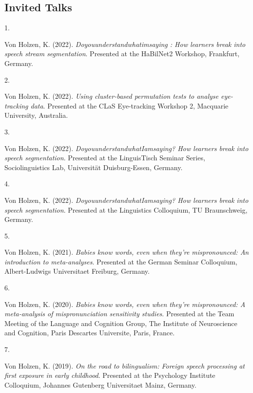 \documentclass[10pt,a4paper,]{article}
\newlength{\cslhangindent}
\newlength{\csllabelwidth}
\newcommand{\CSLLeftMargin}[1]{\parbox[t]{\csllabelwidth}{\hfill #1~}}
\newcommand{\CSLRightInline}[1]{\parbox[t]{\linewidth - \cslhangindent - \csllabelwidth}{#1}\vspace{0.8ex}}
\begin{document}
\hypertarget{invited-talks}{%
\subsection{Invited Talks}\label{invited-talks}}

\hypertarget{bibliography}{}
\leavevmode{}%
\CSLLeftMargin{1. }%
\CSLRightInline{Von Holzen, K. (2022). \emph{Doyouunderstandwhatimsaying
: How learners break into speech stream segmentation}. Presented at the
HaBilNet2 Workshop, Frankfurt, Germany.}

\leavevmode{}%
\CSLLeftMargin{2. }%
\CSLRightInline{Von Holzen, K. (2022). \emph{Using cluster-based
permutation tests to analyse eye-tracking data}. Presented at the CLaS
Eye-tracking Workshop 2, Macquarie University, Australia.}

\leavevmode{}%
\CSLLeftMargin{3. }%
\CSLRightInline{Von Holzen, K. (2022).
\emph{DoyouunderstandwhatIamsaying? How learners break into speech
segmentation}. Presented at the LinguisTisch Seminar Series,
Sociolinguistics Lab, Universität Duisburg-Essen, Germany.}

\leavevmode{}%
\CSLLeftMargin{4. }%
\CSLRightInline{Von Holzen, K. (2022).
\emph{DoyouunderstandwhatIamsaying? How learners break into speech
segmentation}. Presented at the Linguistics Colloquium, TU Braunschweig,
Germany.}

\leavevmode{}%
\CSLLeftMargin{5. }%
\CSLRightInline{Von Holzen, K. (2021). \emph{Babies know words, even
when they're mispronounced: An introduction to meta-analyses}. Presented
at the German Seminar Colloquium, Albert-Ludwigs Universitaet Freiburg,
Germany.}

\leavevmode{}%
\CSLLeftMargin{6. }%
\CSLRightInline{Von Holzen, K. (2020). \emph{Babies know words, even
when they're mispronounced: A meta-analysis of mispronunciation
sensitivity studies}. Presented at the Team Meeting of the Language and
Cognition Group, The Institute of Neuroscience and Cognition, Paris
Descartes Universite, Paris, France.}

\leavevmode{}%
\CSLLeftMargin{7. }%
\CSLRightInline{Von Holzen, K. (2019). \emph{On the road to
bilingualism: Foreign speech processing at first exposure in early
childhood}. Presented at the Psychology Institute Colloquium, Johannes
Gutenberg Universitaet Mainz, Germany.}
\end{document}
